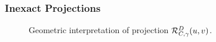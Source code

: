 \begin{frame}[t]\frametitle{Inexact Projections}\bigskip   
  \begin{figure}[H]
  \begin{subfigmatrix}{2}
  \end{subfigmatrix}
  \caption{Geometric interpretation of projection ${\cal R}_{C,\gamma}^{D}(u, v)$.}
  \label{fig:condProj1}
\end{figure}
\end{frame}

